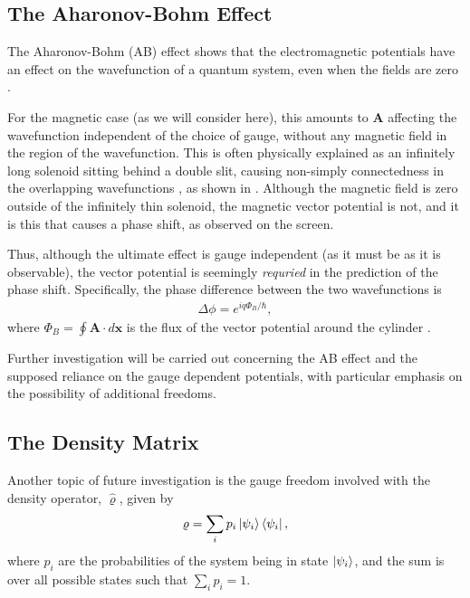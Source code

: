 \subsection{The Aharonov-Bohm Effect}

The Aharonov-Bohm (AB) effect shows that the electromagnetic potentials have an
effect on the wavefunction of a quantum system, even when the fields are zero
\cite{aharonov-bohm}.

For the magnetic case (as we will consider here), this amounts to $\mathbf{A}$
affecting the wavefunction independent of the choice of gauge, without any
magnetic field in the region of the wavefunction. This is often physically
explained as an infinitely long solenoid sitting behind a double slit, causing
non-simply connectedness in the overlapping wavefunctions
\cite{aharonov-rohrlich}, as shown in .  Although the
magnetic field is zero outside of the infinitely thin solenoid, the magnetic
vector potential is not, and it is this that causes a phase shift, as observed
on the screen.

Thus, although the ultimate effect is gauge independent (as it must be as it is
observable), the vector potential is seemingly \textit{requried} in the
prediction of the phase shift. Specifically, the phase difference between the
two wavefunctions is
\begin{align}
    \Delta \phi = e^{i q \Phi_B / \hbar},
\end{align}
where $\Phi_B = \oint \mathbf{A} \cdot d\mathbf{x}$ is the flux of the vector
potential around the cylinder \cite{aharonov-rohrlich}.

Further investigation will be carried out concerning the AB effect and the
supposed reliance on the gauge dependent potentials, with particular emphasis on
the possibility of additional freedoms.

\subsection{The Density Matrix}

Another topic of future investigation is the gauge freedom involved with the
density operator, $\hat \varrho$, given by
\begin{align}
    \varrho = \sum_i p_i \Ket{\psi_i}\bra{\psi_i},
\end{align}
where $p_i$ are the probabilities of the system being in state $\Ket{\psi_i}$,
and the sum is over all possible states such that $\sum_i p_i = 1$.

